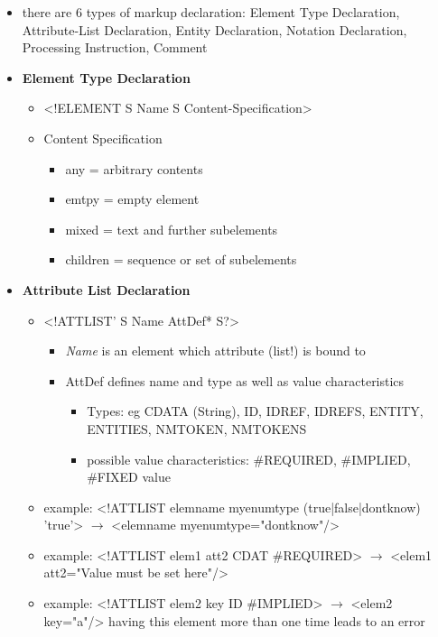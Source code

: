 \documentclass[11pt]{article}
\begin{document}
\begin{itemize}
\item there are 6 types of markup declaration: Element Type Declaration, Attribute-List Declaration, Entity Declaration, Notation Declaration, Processing Instruction, Comment
\item \textbf{Element Type Declaration}
\begin{itemize}
\item <!ELEMENT S Name S Content-Specification>
\item Content Specification
\begin{itemize}
\item any = arbitrary contents
\item emtpy = empty element
\item mixed = text and further subelements
\item children = sequence or set of subelements
\end{itemize}
\end{itemize}
\item \textbf{Attribute List Declaration}
\begin{itemize}
\item <!ATTLIST' S Name AttDef* S?>
\begin{itemize}
\item \emph{Name} is an element which attribute (list!) is bound to
\item AttDef defines name and type as well as value characteristics
\begin{itemize}
\item Types: eg CDATA (String), ID, IDREF, IDREFS, ENTITY, ENTITIES, NMTOKEN, NMTOKENS
\item possible value characteristics: \#REQUIRED, \#IMPLIED, \#FIXED value
\end{itemize}
\end{itemize}
\item example: <!ATTLIST elemname myenumtype (true|false|dontknow) 'true'> \(\rightarrow\) <elemname myenumtype="dontknow"/>
\item example: <!ATTLIST elem1 att2 CDAT \#REQUIRED> \(\rightarrow\) <elem1 att2="Value must be set here"/>
\item example: <!ATTLIST elem2 key ID \#IMPLIED> \(\rightarrow\) <elem2 key="a"/> having this element more than one time leads to an error
\end{itemize}
\end{itemize}
\end{document}
